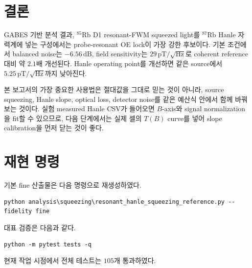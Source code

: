 \documentclass[11pt,a4paper]{article}
\newcommand{\dB}{\,\mathrm{dB}}
\newcommand{\pT}{\,\mathrm{pT}}
\newcommand{\sqrtHz}{/\sqrt{\mathrm{Hz}}}
\newcommand{\Rb}[1]{\({}^{#1}\mathrm{Rb}\)}
\begin{document}
\section{결론}

GABES 기반 분석 결과, \Rb{85} D1 resonant-FWM squeezed light를 \Rb{87} Hanle 자력계에 넣는
구성에서는 probe-resonant OE lock이 가장 강한 후보이다. 기본 조건에서 balanced noise는
\(-6.56\dB\), field sensitivity는 \(29\pT\sqrtHz\)로 coherent reference 대비 약 \(2.1\)배
개선된다. Hanle operating point를 개선하면 같은 source에서 \(5.25\pT\sqrtHz\)까지 낮아진다.

본 보고서의 가장 중요한 사용법은 절대값을 그대로 믿는 것이 아니라,
source squeezing, Hanle slope, optical loss, detector noise를 같은 예산식 안에서 함께 바꿔 보는 것이다.
실험 measured Hanle CSV가 들어오면 \(B\)-axis와 signal normalization을 fit할 수 있으므로,
다음 단계에서는 실제 셀의 \(T(B)\) curve를 넣어 slope calibration을 먼저 닫는 것이 좋다.

\appendix
\section{재현 명령}

기본 fine 산출물은 다음 명령으로 재생성하였다.
\begin{verbatim}
python analysis\squeezing\resonant_hanle_squeezing_reference.py --fidelity fine
\end{verbatim}

대표 검증은 다음과 같다.
\begin{verbatim}
python -m pytest tests -q
\end{verbatim}
현재 작업 시점에서 전체 테스트는 \(105\)개 통과하였다.
\end{document}
